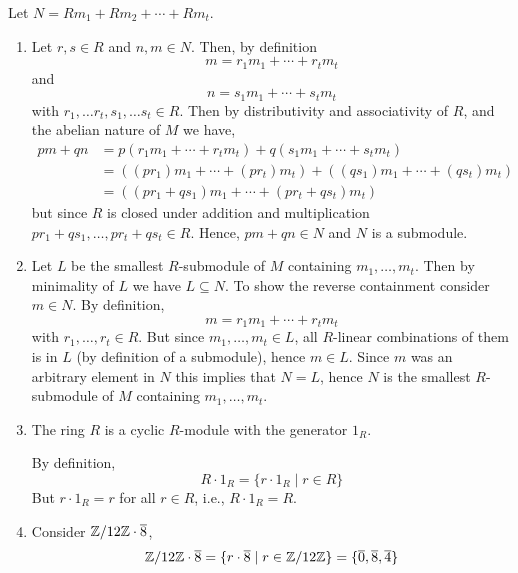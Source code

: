 \documentclass[Notebook.tex]{subfiles}
\begin{document}
    \begin{solution}
        \bbni

        Let $N = Rm_1 + Rm_2 + \cdots + Rm_t$. 
        \begin{enumerate}
            \item 
            Let $r, s \in R$ and $n, m \in N$. Then, by definition 
            \[m = r_1m_1+\cdots+r_tm_t\] 
            and \[n = s_1m_1+\cdots+s_tm_t\] 
            with $r_1, \ldots r_t, s_1, \ldots s_t \in R$. Then by distributivity and associativity of $R$, and the abelian nature of $M$ we have, 
            \begin{align*}
                pm + qn &=  p\left(r_1m_1 + \cdots + r_tm_t\right) + q\left(s_1m_1 + \cdots + s_tm_t\right)\\
                 &= \left((pr_1)m_1 + \cdots + (pr_t)m_t\right) + \left((qs_1)m_1 + \cdots + (qs_t)m_t\right) \\ 
                 &= \left((pr_1 + qs_1)m_1 + \cdots + (pr_t+qs_t)m_t\right) 
            \end{align*}
            but since $R$ is closed under addition and multiplication $pr_1+qs_1, \ldots, pr_t+qs_t \in R$. Hence, $pm + qn \in N$ and $N$ is a submodule.
            
            \item Let $L$ be the smallest $R$-submodule of $M$ containing $m_1, \ldots, m_t$. Then by minimality of $L$ we have $L \subseteq N$. To show the reverse containment consider $m \in N$. By definition, 
            \[m = r_1m_1+\cdots+r_tm_t\] 
            with $r_1, \ldots, r_t \in R$. But since $m_1, \ldots, m_t \in L$, all $R$-linear combinations of them is in $L$ (by definition of a submodule), hence $m \in L$. Since $m$ was an arbitrary element in $N$ this implies that $N=L$, hence $N$ is the smallest $R$-submodule of $M$ containing $m_1, \ldots, m_t$. 

            \item The ring $R$ is a cyclic $R$-module with the generator $1_R$. 
            
            By definition, 
            \[R \cdot 1_R = \{r \cdot 1_R \mid r \in R\}\]
            But $r \cdot 1_R = r$ for all $r \in R$, i.e., $R \cdot 1_R = R$. 

            \item Consider $\mathbb Z/12\mathbb Z \cdot \overline{8}$, 
            \[\mathbb Z/12\mathbb Z \cdot \overline{8} = \{r \cdot \overline{8} \mid r \in \mathbb Z /12\mathbb Z\} = \{\overline{0}, \overline{8}, \overline{4}\}\]


\end{enumerate}
\end{solution}
\end{document}
